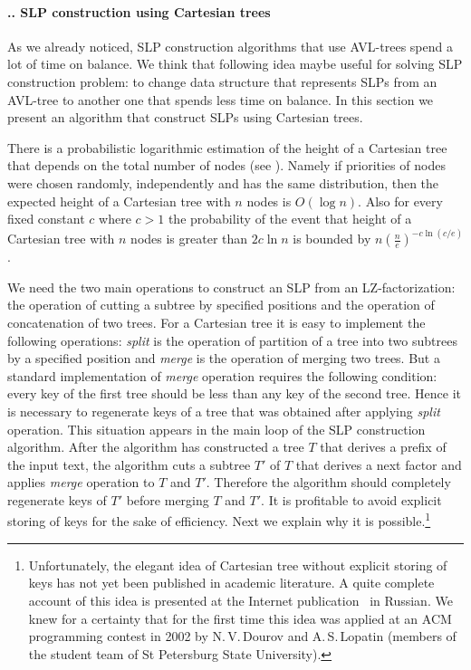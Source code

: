 ﻿\documentclass[11pt]{article}
\theoremstyle{remark}
\newcommand{\subsectionnew}[1]{
    \addtocounter{subsection}{1}
    \paragraph*{\arabic{section}.\arabic{subsection}. #1}
}
\begin{document}
\subsectionnew{SLP construction using Cartesian trees}

As we already noticed, SLP construction algorithms that use AVL-trees spend a lot of time on balance. We think that following idea
maybe useful for solving SLP construction problem: to change data structure that represents
SLPs from an AVL-tree to another one that spends less time on balance. In this section we present an algorithm
that construct SLPs using Cartesian trees.

There is a probabilistic logarithmic estimation of the height of a Cartesian tree that depends on the total number of nodes (see
\cite{Seidel&Aragon:1996}). Namely if priorities of nodes were chosen randomly, independently and has the same
distribution, then the expected height of a Cartesian tree with $n$ nodes is $O(\log n)$. Also for every fixed constant $c$ where $c>1$
the probability of the event that height of a Cartesian tree with $n$ nodes is greater than $2c\ln n$ is bounded by 
$n\left(\frac{n}{e}\right)^{-c\ln(c/e)}$.

We need the two main operations to construct an SLP from an LZ-factorization: the operation of cutting a subtree by
specified positions and the operation of concatenation of two trees. For a Cartesian tree it is easy to implement the
following operations: \emph{split} is the operation of partition of a tree into two subtrees by a specified position and
\emph{merge} is the operation of merging two trees. But a standard implementation of \emph{merge} operation requires
the following condition: every key of the first tree should be less than any key of the second tree. Hence it is
necessary to regenerate keys of a tree that was obtained after applying \emph{split} operation. This situation appears
in the main loop of the SLP construction algorithm. After the algorithm has constructed a tree $T$ that derives a prefix of 
the input text, the algorithm cuts a subtree $T'$ of $T$ that derives a next factor and applies \emph{merge} operation to $T$ and $T'$. 
Therefore the algorithm should completely regenerate keys of $T'$ before merging $T$ and $T'$. It is profitable to avoid explicit storing of
keys for the sake of efficiency. Next we explain why it is possible.\footnote{Unfortunately, the elegant idea of
Cartesian tree without explicit storing of keys has not yet been published in academic literature. A quite complete account of this idea is
presented at the Internet publication~\cite{Pol10} in Russian. We knew for a certainty that for the first time this idea was
applied at an ACM programming contest in 2002 by N.\,V.\,Dourov and A.\,S.\,Lopatin (members of the student team of St
Petersburg State University).}
\end{document}
